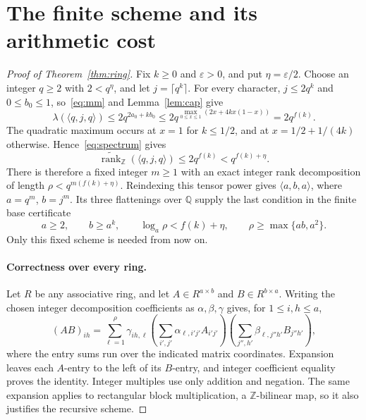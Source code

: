 \documentclass[11pt]{article}
\theoremstyle{remark}
\newcommand{\Z}{\mathbb Z}
\newcommand{\Q}{\mathbb Q}
\newcommand{\ark}{\widetilde{\operatorname{rank}}_{\Z}}
\begin{document}
\section{The finite scheme and its arithmetic cost}

\begin{proof}[Proof of Theorem~\ref{thm:ring}]
Fix $k\geq0$ and $\varepsilon>0$, and put $\eta=\varepsilon/2$.
Choose an integer $q\geq2$ with $2<q^\eta$, and let
$j=\lceil q^k\rceil$. For every character, $j\leq2q^k$ and
$0\leq b_0\leq1$, so~\eqref{eq:mm} and Lemma~\ref{lem:cap} give
\[
 \lambda(\langle q,j,q\rangle)
 \leq2q^{2a_0+kb_0}
 \leq2q^{\max_{0\leq x\leq1}(2x+4kx(1-x))}=2q^{f(k)}.
\]
The quadratic maximum occurs at $x=1$ for $k\leq1/2$, and at
$x=1/2+1/(4k)$ otherwise. Hence~\eqref{eq:spectrum} gives
\[
 \ark(\langle q,j,q\rangle)\leq2q^{f(k)}<q^{f(k)+\eta}.
\]
There is therefore a fixed integer $m\geq1$ with an exact integer
rank decomposition of length $\rho<q^{m(f(k)+\eta)}$. Reindexing
this tensor power gives $\langle a,b,a\rangle$, where
$a=q^m$, $b=j^m$. Its three flattenings over $\Q$ supply the last
condition in the finite base certificate
\begin{equation}\label{eq:scheme}
 a\geq2,\qquad b\geq a^k,\qquad
 \log_a\rho<f(k)+\eta,\qquad \rho\geq\max\{ab,a^2\}.
\end{equation}
Only this fixed scheme is needed from now on.

\paragraph{Correctness over every ring.}
Let $R$ be any associative ring, and let
$A\in R^{a\times b}$ and $B\in R^{b\times a}$.
Writing the chosen integer decomposition coefficients as
$\alpha,\beta,\gamma$ gives, for $1\leq i,h\leq a$,
\[
 (AB)_{ih}=\sum_{\ell=1}^{\rho}\gamma_{ih,\ell}
 \left(\sum_{i',j'}\alpha_{\ell,i'j'}A_{i'j'}\right)
 \left(\sum_{j'',h'}\beta_{\ell,j''h'}B_{j''h'}\right),
\]
where the entry sums run over the indicated matrix coordinates.
Expansion leaves each $A$-entry to the left of its $B$-entry, and
integer coefficient equality proves the identity. Integer multiples
use only addition and negation. The same expansion applies to
rectangular block multiplication, a $\Z$-bilinear map, so it also
justifies the recursive scheme.


\end{proof}
\end{document}
